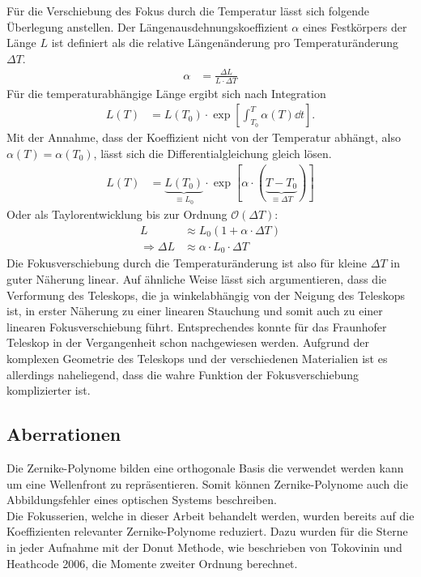 Für die Verschiebung des Fokus durch die Temperatur lässt sich folgende Überlegung anstellen. Der Längenausdehnungskoeffizient $\alpha$ eines Festkörpers der Länge $L$ ist definiert als die relative Längenänderung pro Temperaturänderung $\Delta T$.
\begin{align}
	\alpha &= \frac{\Delta L}{L\cdot \Delta T}
\end{align}
Für die temperaturabhängige Länge ergibt sich nach Integration
\begin{align}
	L(T) &= L(T_0)\cdot \exp[\int_{T_0}^T\alpha(T)\dd{t}].
\end{align}
Mit der Annahme, dass der Koeffizient nicht von der Temperatur abhängt, also $\alpha(T) = \alpha(T_0)$, lässt sich die Differentialgleichung gleich lösen.
\begin{align}
	L(T) &= \underbrace{L(T_0)}_{\equiv L_0}\cdot \exp[\alpha\cdot (\underbrace{T-T_0}_{\equiv \Delta T})]
\end{align}
Oder als Taylorentwicklung bis zur Ordnung $\mathcal{O}(\Delta T)$:
\begin{align}
	L &\approx L_0(1+\alpha\cdot\Delta T)\\
    \Rightarrow \Delta L &\approx \alpha \cdot L_0\cdot \Delta T
\end{align}
Die Fokusverschiebung durch die Temperaturänderung ist also für kleine $\Delta T$ in guter Näherung linear. Auf ähnliche Weise lässt sich argumentieren, dass die Verformung des Teleskops, die ja winkelabhängig von der Neigung des Teleskops ist, in erster Näherung zu einer linearen Stauchung und somit auch zu einer linearen Fokusverschiebung führt. Entsprechendes konnte für das Fraunhofer Teleskop in der Vergangenheit schon nachgewiesen werden\cite{commissioning}. Aufgrund der komplexen Geometrie des Teleskops und der verschiedenen Materialien ist es allerdings naheliegend, dass die wahre Funktion der Fokusverschiebung komplizierter ist.

\subsection{Aberrationen}

Die Zernike-Polynome bilden eine orthogonale Basis die verwendet werden kann um eine Wellenfront zu repräsentieren. Somit können Zernike-Polynome auch die Abbildungsfehler eines optischen Systems beschreiben.\\
Die Fokusserien, welche in dieser Arbeit behandelt werden, wurden bereits auf die Koeffizienten relevanter Zernike-Polynome reduziert. Dazu wurden für die Sterne in jeder Aufnahme mit der Donut Methode, wie beschrieben von Tokovinin und Heathcode 2006\cite{donut}, die Momente zweiter Ordnung berechnet.

